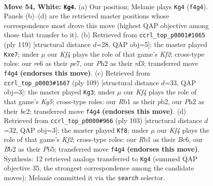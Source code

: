 \documentclass[11pt]{article}
\begin{document}
\clearpage

\begin{figure}[p]\centering
\begin{subfigure}{0.46\textwidth}\centering
\resizebox{\linewidth}{!}{%
\newchessgame
\chessboard[
  setfen={6k1/3n4/4r3/6P1/p1p2K2/P1P4p/1BP4P/1R6 w - - 1 54},
  showmover=false,
  pgfstyle=straightmove, color=movearrow, markmove={f4-g4}
]}
\caption{}
\end{subfigure}\hfill
\begin{subfigure}{0.46\textwidth}\centering
\resizebox{\linewidth}{!}{%
\newchessgame
\chessboard[
  setfen={8/4Pk1p/pr6/1bp2P1p/2p5/2P2NK1/R7/8 b - - 0 60},
  showmover=false,
  pgfstyle=straightmove, color=movearrow, markmove={f7-e7}
]}
\caption{}
\end{subfigure}
\\[4pt]
\begin{subfigure}{0.46\textwidth}\centering
\resizebox{\linewidth}{!}{%
\newchessgame
\chessboard[
  setfen={8/5R2/p2p4/P1b5/1pP3k1/8/KPB5/4r3 b - - 0 55},
  showmover=false,
  pgfstyle=straightmove, color=movearrow, markmove={g4-g3}
]}
\caption{}
\end{subfigure}\hfill
\begin{subfigure}{0.46\textwidth}\centering
\resizebox{\linewidth}{!}{%
\newchessgame
\chessboard[
  setfen={8/4pk2/2b5/1pP2Pp1/p5P1/P1B1K3/8/8 b - - 23 52},
  showmover=false,
  pgfstyle=straightmove, color=movearrow, markmove={f7-f8}
]}
\caption{}
\end{subfigure}
\caption{\textbf{Move 54, White: \texttt{Kg4}.} (a) Our position; Melanie plays \texttt{Kg4} (\texttt{f4g4}). Panels (b)--(d) are the retrieved master positions whose correspondence most drove this move (highest QAP objective among those that transfer to it). (b) Retrieved from \texttt{ccrl\_top\_p0001\#1065} (ply 119) [structural distance $d$=28, QAP obj=5]: the master played \texttt{Kxe7}; under $\mu$ our \emph{Kf4} plays the role of that game's \emph{Kf2}; cross-type roles: our \emph{r}e6 as their \emph{p}e7, our \emph{P}h2 as their \emph{n}f3; transferred move \texttt{f4g4} \textbf{(endorses this move)}. (c) Retrieved from \texttt{ccrl\_top\_p0003\#1667} (ply 109) [structural distance $d$=33, QAP obj=3]: the master played \texttt{Kg3}; under $\mu$ our \emph{Kf4} plays the role of that game's \emph{Kg5}; cross-type roles: our \emph{R}b1 as their \emph{p}b2, our \emph{P}h2 as their \emph{b}c2; transferred move \texttt{f4g4} \textbf{(endorses this move)}. (d) Retrieved from \texttt{ccrl\_top\_p0000\#966} (ply 103) [structural distance $d$=32, QAP obj=3]: the master played \texttt{Kf8}; under $\mu$ our \emph{Kf4} plays the role of that game's \emph{Kf2}; cross-type roles: our \emph{R}b1 as their \emph{B}c6, our \emph{B}b2 as their \emph{P}b5; transferred move \texttt{f4g4} \textbf{(endorses this move)}. Synthesis: 12 retrieved analogs transferred to \texttt{Kg4} (summed QAP objective 35, the strongest correspondence among the candidate moves); Melanie committed it via the \texttt{search} selector.}
\label{fig:thought-m106}
\end{figure}
\end{document}
